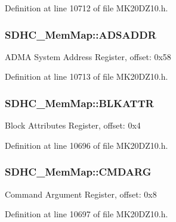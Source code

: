 Definition at line 10712 of file M\+K20\+D\+Z10.\+h.

\subsubsection[{\texorpdfstring{A\+D\+S\+A\+D\+DR}{ADSADDR}}]{ S\+D\+H\+C\+\_\+\+Mem\+Map\+::\+A\+D\+S\+A\+D\+DR}\hypertarget{struct_s_d_h_c___mem_map_add3530fe9767f7ef0f6401c049cd0d6f}{}\label{struct_s_d_h_c___mem_map_add3530fe9767f7ef0f6401c049cd0d6f}
A\+D\+MA System Address Register, offset\+: 0x58 

Definition at line 10713 of file M\+K20\+D\+Z10.\+h.

\subsubsection[{\texorpdfstring{B\+L\+K\+A\+T\+TR}{BLKATTR}}]{ S\+D\+H\+C\+\_\+\+Mem\+Map\+::\+B\+L\+K\+A\+T\+TR}\hypertarget{struct_s_d_h_c___mem_map_a0a3c9777e2dc6450d432235b772eddda}{}\label{struct_s_d_h_c___mem_map_a0a3c9777e2dc6450d432235b772eddda}
Block Attributes Register, offset\+: 0x4 

Definition at line 10696 of file M\+K20\+D\+Z10.\+h.

\subsubsection[{\texorpdfstring{C\+M\+D\+A\+RG}{CMDARG}}]{ S\+D\+H\+C\+\_\+\+Mem\+Map\+::\+C\+M\+D\+A\+RG}\hypertarget{struct_s_d_h_c___mem_map_a74b8ea7db5c12a06f19e8054bba5c2b3}{}\label{struct_s_d_h_c___mem_map_a74b8ea7db5c12a06f19e8054bba5c2b3}
Command Argument Register, offset\+: 0x8 

Definition at line 10697 of file M\+K20\+D\+Z10.\+h.

